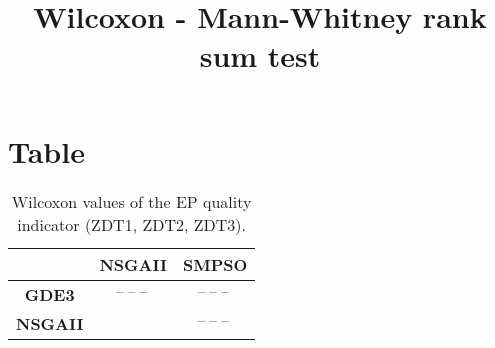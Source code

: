 \documentclass{article}
\title{Wilcoxon - Mann-Whitney rank sum test}
\author{}
\begin{document}
\maketitle
\section{Table}
\begin{table}[!htp]
  \caption{Wilcoxon values of the EP quality indicator (ZDT1, ZDT2, ZDT3).}
  \label{table:EP}
  \centering
  \begin{scriptsize}
  \begin{tabular}{c|cc}
      & \textbf{NSGAII} & \textbf{SMPSO} \\\hline
      \textbf{GDE3} & $\text{--}\ \text{--}\ \text{--}\  $ & $ \text{--}\ \text{--}\ \text{--}\ $ \\
      \textbf{NSGAII} & $ $ & $ \text{--}\ \text{--}\ \text{--}\ $ \\
  \end{tabular}
  \end{scriptsize}
\end{table}
\end{document}
